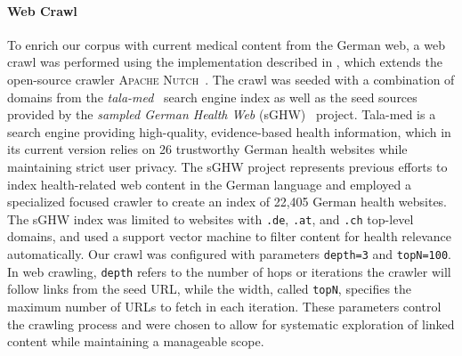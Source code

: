 \paragraph{Web Crawl}
To enrich our corpus with current medical content from the German web, a web
crawl was performed using the implementation described in
\cite{deng2025crawler}, which extends the open-source crawler \textsc{Apache
Nutch}~\cite{khare2004nutch}. The crawl was seeded with a combination of domains
from the \textit{tala-med}~\cite{specht2025evaluating} search engine index as
well as the seed sources provided by the \textit{sampled German Health Web}
(sGHW)~\cite{zowalla2020crawling} project. Tala-med is a search engine providing
high-quality, evidence-based health information, which in its current version
relies on 26 trustworthy German health websites while maintaining strict user
privacy. The sGHW project represents previous efforts to index health-related
web content in the German language and employed a specialized focused crawler to
create an index of 22,405 German health websites. The sGHW index was limited to
websites with \texttt{.de}, \texttt{.at}, and \texttt{.ch} top-level domains,
and used a support vector machine to filter content for health relevance
automatically. Our crawl was configured with parameters \texttt{depth=3} and
\texttt{topN=100}. In web crawling, \texttt{depth} refers to the number of hops
or iterations the crawler will follow links from the seed URL, while the width,
called \texttt{topN}, specifies the maximum number of URLs to fetch in each
iteration. These parameters control the crawling process and were chosen to
allow for systematic exploration of linked content while maintaining a
manageable scope. 

